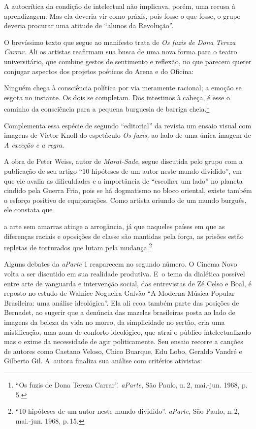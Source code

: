 {A autocrítica da condição de intelectual não implicava, porém, uma
recusa à aprendizagem. Mas ela deveria vir como práxis, pois fosse o que
fosse, o grupo deveria procurar uma atitude de “alunos da Revolução”.

O brevíssimo texto que segue ao manifesto trata de {\it Os
fuzis de Dona Tereza Carrar}. Ali os artistas reafirmam sua busca de uma
nova forma para o teatro universitário, que combine gestos de sentimento
e reflexão, no que parecem querer conjugar aspectos dos projetos
poéticos do Arena e do Oficina:

\startblockquote
Ninguém chega à consciência política por via meramente racional; a
emoção se esgota no instante. Os dois se completam. Dos intestinos à
cabeça, é esse o caminho da consciência para a pequena burguesia de
barriga cheia.\footnote{“Os fuzis de Dona Tereza Carrar”. {\it aParte},
  São Paulo, n.\,2, mai.-jun. 1968, p.\,5.}
\stopblockquote

Complementa essa espécie de segundo “editorial” da revista um ensaio
visual com imagens de Victor Knoll do espetáculo {\it Os fuzis,} ao lado
de uma única imagem de {\it A exceção e a regra}.

A obra de Peter Weiss, autor de {\it Marat-Sade}, segue discutida pelo grupo
com a publicação de seu artigo “10 hipóteses de um autor neste mundo
dividido”, em que ele avalia as dificuldades e a importância de
“escolher um lado” no planeta cindido pela Guerra Fria, pois se há
dogmatismo no bloco oriental, existe também o esforço positivo de
equiparações. Como artista oriundo de um mundo burguês, ele constata que

\startblockquote
a arte sem amarras atinge a arrogância, já que naqueles países em que as
diferenças raciais e oposições de classe são mantidas pela força, as
prisões estão repletas de torturados que lutam pela mudança.\footnote{“10
  hipóteses de um autor neste mundo dividido”. {\it aParte}, São Paulo,
  n.\,2, mai.-jun. 1968, p.\,15.}
\stopblockquote

Alguns debates da {\it aParte} 1 reaparecem no segundo número. O
Cinema Novo volta a ser discutido em sua realidade produtiva. E~o tema
da dialética possível entre arte de vanguarda e intervenção social, das
entrevistas de Zé Celso e Boal, é reposto no estudo de Walnice Nogueira
Galvão “A Moderna Música Popular Brasileira: uma análise
ideológica”. Ela ali ecoa também parte das posições de Bernadet, ao
sugerir que a denúncia das mazelas brasileiras posta ao lado de imagens
da beleza da vida no morro, da simplicidade no sertão, cria uma
mistificação, uma zona de conforto ideológico, que atrai o público
intelectualizado mas o exime da necessidade de agir politicamente. Seu
ensaio recorre a canções de autores como Caetano Veloso, Chico Buarque,
Edu Lobo, Geraldo Vandré e Gilberto Gil. A~autora finaliza sua análise
com critérios ativistas:

}

